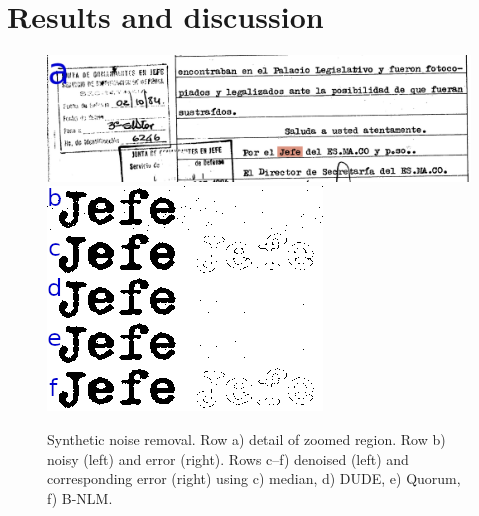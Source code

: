 \documentclass{article}
\begin{document}
\section{Results and discussion}
\label{sec:results}
%
\begin{figure}
    \centering
    \includegraphics[width=0.85\columnwidth]{r0566_0008_crop_hl_2.png}\\[2ex]
    \includegraphics[width=0.85\columnwidth]{jefe2.png}
    \caption{\label{fig:visual-sim} Synthetic noise removal. Row a) detail of zoomed region. Row b) noisy (left) and error (right). Rows c--f) denoised (left) and corresponding error (right) using c) median, d) DUDE, e) Quorum, f) B-NLM.}    
\end{figure}
%
\end{document}
